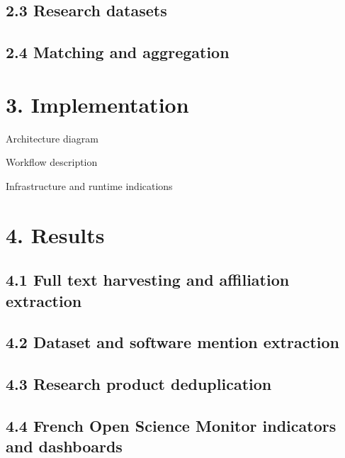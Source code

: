 \documentclass[
]{article}
\begin{document}
\citep{GROBID} \citep{du_softcite_2021}

\hypertarget{research-datasets}{%
\subsection{2.3 Research datasets}\label{research-datasets}}

\hypertarget{matching-and-aggregation}{%
\subsection{2.4 Matching and
aggregation}\label{matching-and-aggregation}}

\hypertarget{implementation}{%
\section{3. Implementation}\label{implementation}}

Architecture diagram

Workflow description

Infrastructure and runtime indications

\hypertarget{results}{%
\section{4. Results}\label{results}}

\hypertarget{full-text-harvesting-and-affiliation-extraction}{%
\subsection{4.1 Full text harvesting and affiliation
extraction}\label{full-text-harvesting-and-affiliation-extraction}}

\hypertarget{dataset-and-software-mention-extraction}{%
\subsection{4.2 Dataset and software mention
extraction}\label{dataset-and-software-mention-extraction}}

\hypertarget{research-product-deduplication}{%
\subsection{4.3 Research product
deduplication}\label{research-product-deduplication}}

\hypertarget{french-open-science-monitor-indicators-and-dashboards}{%
\subsection{4.4 French Open Science Monitor indicators and
dashboards}\label{french-open-science-monitor-indicators-and-dashboards}}
\end{document}
